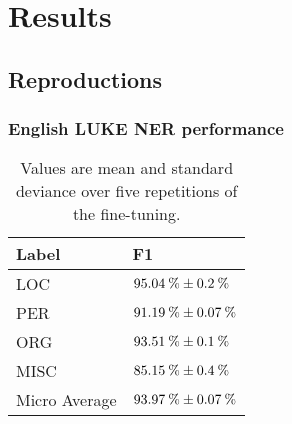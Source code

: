 \documentclass[main.tex]{subfiles}
\begin{document}
\chapter{Results}

\section{Reproductions}
\subsection{English LUKE NER performance}
\begin{table}[H]
    \begin{tabular}{ll}
        Label & F1\\\hline
        LOC             & $95.04\:\text{\%{}} \pm 0.2\:\text{\%{}}$\\
        PER             & $91.19\:\text{\%{}} \pm 0.07\:\text{\%{}}$\\
        ORG             & $93.51\:\text{\%{}} \pm 0.1\:\text{\%{}}$\\
        MISC            & $85.15\:\text{\%{}} \pm 0.4\:\text{\%{}}$\\\hline
        Micro Average   & $93.97\:\text{\%{}} \pm 0.07\:\text{\%{}}$ 
    \end{tabular}
    \caption{
        Values are mean and standard deviance over five repetitions of the fine-tuning.
    }
\end{table}
\end{document}
